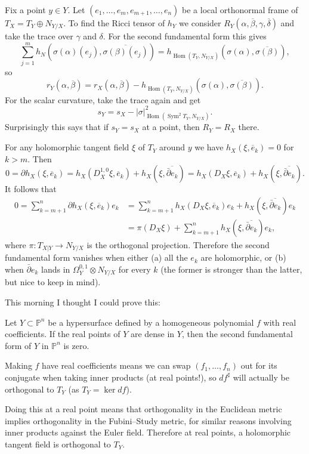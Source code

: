 \documentclass[11pt]{amsart}
\theoremstyle{definition}
\newcommand{\kk}[1]{\mathbb{#1}}
\def\ov#1{\overline{#1}}
\DeclareMathOperator{\Hom}{Hom}
\begin{document}
Fix a point $y \in Y$.
Let $(e_1,\ldots,e_m,e_{m+1},\ldots,e_n)$ be a local orthonormal frame of $T_X =
T_Y \oplus N_{Y/X}$.
To find the Ricci tensor of $h_Y$ we consider $R_Y(\alpha, \ov\beta, \gamma,
\ov\delta)$ and take the trace over $\gamma$ and $\delta$. For the second
fundamental form this gives
$$
\sum_{j=1}^m h_N(\sigma(\alpha)(e_j), \ov{\sigma(\beta)(e_j)})
= h_{\Hom(T_Y, N_{Y/X})}(\sigma(\alpha), \ov{\sigma(\beta)}),
$$
so
$$
r_Y(\alpha, \ov\beta)
= r_X(\alpha, \ov\beta)
- h_{\Hom(T_Y, N_{Y/X})}(\sigma(\alpha), \ov{\sigma(\beta)}).
$$
For the scalar curvature, take the trace again and get
$$
s_Y = s_X - |\sigma|^2_{\Hom(\operatorname{Sym}^2 T_Y, N_{Y/X})}.
$$
Surprisingly this says that if $s_Y = s_X$ at a point, then $R_Y = R_X$ there.


For any holomorphic tangent field $\xi$ of $T_Y$ around $y$ we have
$h_X(\xi, \ov e_k) = 0$ for $k > m$. Then
$$
0 = \partial h_X(\xi, \ov e_k)
= h_X(D_X^{1,0} \xi, \ov e_k) + h_X(\xi, \ov{\bar\partial e_k})
= h_X(D_X \xi, \ov e_k) + h_X(\xi, \ov{\bar\partial e_k}).
$$
It follows that
\begin{align*}
0
= \!\!\! \sum_{k=m+1}^n \!\!\! \partial h_X(\xi, \ov e_k) e_k
&= \!\!\! \sum_{k=m+1}^n \!\!\! h_X(D_X \xi, \ov e_k)e_k + h_X(\xi, \ov{\bar\partial e_k}) e_k
\\
&= \pi(D_X \xi) + \!\!\! \sum_{k=m+1}^n \!\!\! h_X(\xi, \ov{\bar\partial e_k}) e_k,
\end{align*}
where $\pi : T_{X|Y} \to N_{Y/X}$ is the orthogonal projection.
Therefore the second fundamental form vanishes when either (a) all the $e_k$ are
holomorphic, or (b) when $\bar\partial e_k$ lands in $\Omega_Y^{0,1} \otimes
N_{Y/X}$ for every $k$ (the former is stronger than the latter, but nice to keep
in mind).


This morning I thought I could prove this:

Let $Y \subset \kk P^n$ be a hypersurface defined by a homogeneous polynomial
$f$ with real coefficients.
If the real points of $Y$ are dense in $Y$, then the second fundamental form of
$Y$ in $\kk P^n$ is zero.

Making $f$ have real coefficients means we can swap $(f_1,\ldots,f_n)$ out for
its conjugate when taking inner products (at real points!), so $df^\sharp$ will
actually be orthogonal to $T_Y$ (as $T_Y = \ker df$).

Doing this at a real point means that orthogonality in the Euclidean metric
implies orthogonality in the Fubini--Study metric, for similar reasons involving
inner products against the Euler field.
Therefore at real points, a holomorphic tangent field is orthogonal to $T_Y$.
\end{document}

